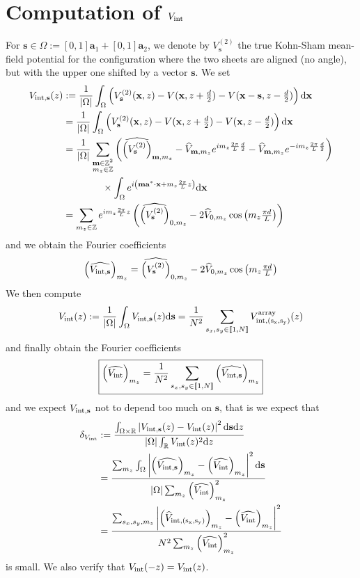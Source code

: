 \documentclass[11pt,a4paper,reqno,french,tikz]{amsart}
\def\d{{\rm d}}
\newcommand{\intent}[1]{\llbracket #1 \rrbracket}
\newcommand{\pa}[1]{\left( #1 \right)} %
\newcommand{\ab}[1]{\left|#1\right|} %
\newcommand{\f}[2]{\frac{#1}{#2}} %
\newcommand{\ind}[1]{_{\textup{#1}}} %
\def\ba{{\mathbf a}}
\def\bx{{\mathbf x}}
\def\bmm{{\mathbf m}}
\def\bs{{\mathbf s}}
\newcommand{\dd}{\tfrac{d}{2}}
\begin{document}
\section{Computation of $V\ind{int}$}%
\label{sec:computation_of_vint_}

For $\bs \in \Omega := [0,1] \ba_1 + [0,1] \ba_2$, we denote by $V^{(2)}_{\bs}$ the true Kohn-Sham mean-field potential for the configuration where the two sheets are aligned (no angle), but with the upper one shifted by a vector $\bs$. We set
\begin{align*}
	V_{\rm int, \bs}(z) &:= \f{1}{\ab{\Omega}} \int_{\Omega}  \left( V^{(2)}_{\bs}(\bx, z) - V(\bx, z + \dd) - V(\bx - \bs, z -\dd)   \right) \d \bx \\
	&= \f{1}{\ab{\Omega}} \int_{\Omega}  \left( V^{(2)}_{\bs}(\bx, z) - V(\bx, z + \dd) - V(\bx, z -\dd)   \right) \d \bx \\
    &= \f{1}{\ab{\Omega}} \sum_{\substack{\bmm \in \Z^2 \\ m_z \in \Z}}  \pa{ \widehat{\pa{V^{(2)}_{\bs}}}_{\bmm,m_z} - \widehat{V}_{\bmm,m_z}e^{i m_z \f{2\pi}{L} \f{d}{2}} -\widehat{V}_{\bmm,m_z} e^{-i m_z \f{2\pi}{L} \f{d}{2}}} \\
    &\qquad \qquad \times \int_{\Omega} e^{i \pa{\bmm \ba^* \cdot \bx + m_z \f{2\pi}{L} z}}\d \bx \\
    &= \sum_{\substack{m_z \in \Z}} e^{i  m_z \f{2\pi}{L} z} \pa{ \widehat{\pa{V^{(2)}_{\bs}}}_{0,m_z} - 2 \widehat{V}_{0,m_z} \cos\pa{ m_z \tfrac{\pi d}{L} }}
\end{align*}
and we obtain the Fourier coefficients
\begin{align*}
\pa{\widehat{V_{\rm{int},\bs}}}_{m_z} = \widehat{\pa{V^{(2)}_{\bs}}}_{0,m_z} - 2 \widehat{V}_{0,m_z} \cos\pa{ m_z \tfrac{\pi d}{L} }
\end{align*}
We then compute
\begin{align*}
V\ind{int}(z) := \f{1}{\ab{\Omega}} \int_\Omega V_{\rm int, \bs}(z) \d \bs = \f{1}{N^2} \sum_{\substack{s_x,s_y \in \intent{1,N}}} V^{\rm{array}}_{\rm int, (s_x,s_y)}(z)
\end{align*}
and finally obtain the Fourier coefficients
\begin{align*}
\boxed{\pa{\widehat{V\ind{int}}}_{m_z} = \f{1}{N^2} \sum_{\substack{s_x,s_y \in \intent{1,N}}} \pa{\widehat{V_{\rm{int},\bs}}}_{m_z}}
\end{align*}
and we expect $V_{\rm{int},\bs}$ not to depend too much on $\bs$, that is we expect that
\begin{align*}
	\delta_{V\ind{int}} &:= \f{\int_{\Omega\times \R} \ab{V_{\rm{int},\bs}(z) - V\ind{int}(z)}^2 \d \bs \d z}{\ab{\Omega} \int_{\R} V\ind{int}(z)^2 \d z} \\
&= \f{\sum_{m_z} \int_{\Omega} \ab{\pa{\widehat{V_{\rm{int},\bs}}}_{m_z} - \pa{\widehat{V\ind{int}}}_{m_z}}^2 \d \bs }{\ab{\Omega} \sum_{m_z}  \pa{\widehat{V\ind{int}}}_{m_z}^2} \\
&= \f{\sum_{s_x,s_y,m_z} \ab{\pa{\widehat{V}_{\rm{int},(s_x,s_y)}}_{m_z} - \pa{\widehat{V\ind{int}}}_{m_z}}^2 }{N^2 \sum_{m_z}  \pa{\widehat{V\ind{int}}}_{m_z}^2}
\end{align*}
is small. We also verify that $V\ind{int}(-z) = V\ind{int}(z)$.
\end{document}
